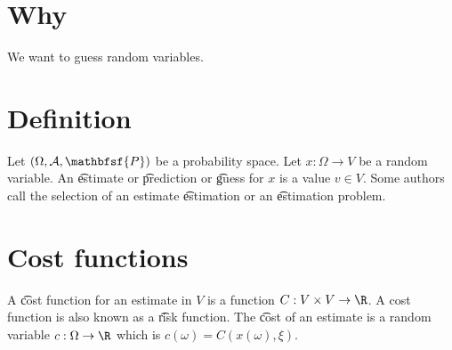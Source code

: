

\section*{Why}

We want to guess random variables.

\section*{Definition}

Let $(\Omega , \mathcal{A} , \mathbfsf{P} )$ be a probability space.
Let $x: \Omega  \to V$ be a random variable.
An \t{estimate} or \t{prediction} or \t{guess} for $x$ is a value $v \in V$.
Some authors call the selection of an estimate \t{estimation} or an \t{estimation problem}.

\section*{Cost functions}

A \t{cost function} for an estimate in $V$ is a function $C: V \times V \to \R $.
A cost function is also known as a \t{risk function}.
The \t{cost} of an estimate is a random variable $c: \Omega \to \R $ which is $c(\omega ) = C(x(\omega ), \xi )$.

\blankpage